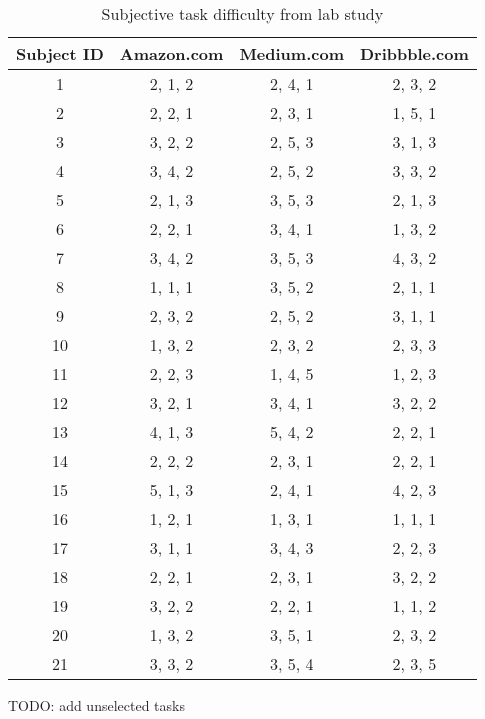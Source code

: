 \begin{table}[H]
      \small
      \centering
      \setlength{\belowcaptionskip}{10pt}
      \caption{Subjective task difficulty from lab study}

      \begin{tabular}{cccc}
            \toprule
            \textbf{Subject ID} & \textbf{Amazon.com} & \textbf{Medium.com} & \textbf{Dribbble.com} \\
            \hline
            1 & 2, 1, 2 & 2, 4, 1 & 2, 3, 2 \\
            2 & 2, 2, 1 & 2, 3, 1 & 1, 5, 1 \\
            3 & 3, 2, 2 & 2, 5, 3 & 3, 1, 3 \\
            4 & 3, 4, 2 & 2, 5, 2 & 3, 3, 2 \\
            5 & 2, 1, 3 & 3, 5, 3 & 2, 1, 3 \\
            6 & 2, 2, 1 & 3, 4, 1 & 1, 3, 2 \\
            7 & 3, 4, 2 & 3, 5, 3 & 4, 3, 2 \\
            8 & 1, 1, 1 & 3, 5, 2 & 2, 1, 1 \\
            9 & 2, 3, 2 & 2, 5, 2 & 3, 1, 1 \\
            10 & 1, 3, 2 & 2, 3, 2 & 2, 3, 3 \\
            11 & 2, 2, 3 & 1, 4, 5 & 1, 2, 3 \\
            12 & 3, 2, 1 & 3, 4, 1 & 3, 2, 2 \\
            13 & 4, 1, 3 & 5, 4, 2 & 2, 2, 1 \\
            14 & 2, 2, 2 & 2, 3, 1 & 2, 2, 1 \\
            15 & 5, 1, 3 & 2, 4, 1 & 4, 2, 3 \\
            16 & 1, 2, 1 & 1, 3, 1 & 1, 1, 1 \\
            17 & 3, 1, 1 & 3, 4, 3 & 2, 2, 3 \\
            18 & 2, 2, 1 & 2, 3, 1 & 3, 2, 2 \\
            19 & 3, 2, 2 & 2, 2, 1 & 1, 1, 2 \\
            20 & 1, 3, 2 & 3, 5, 1 & 2, 3, 2 \\
            21 & 3, 3, 2 & 3, 5, 4 & 2, 3, 5 \\
            \bottomrule
      \end{tabular}
      \label{table:diff}
\end{table}


TODO: add unselected tasks